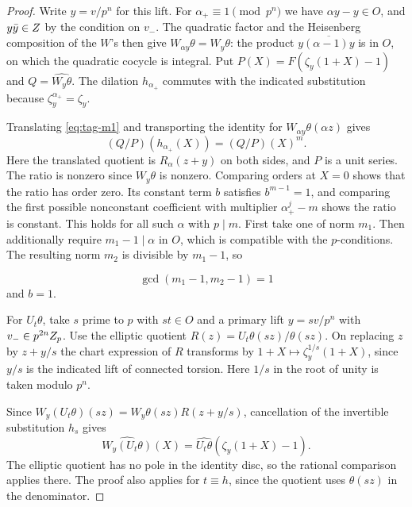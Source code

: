 \begin{proof}

Write \(y=v/p^n\) for this lift. For \(\alpha_+\equiv1\pmod{p^n}\)
we have \(\alpha y-y\in O\), and \(y\bar y\in Z\) by the
condition on \(v_-\). The quadratic factor and the
Heisenberg composition of the \(W\)'s then give
\(W_{\alpha y}\theta=W_y\theta\): the product
\(y\overline{(\alpha-1)y}\) is in \(O\), on which the
quadratic cocycle is integral. Put
\(P(X)=F(\zeta_y(1+X)-1)\) and \(Q=\widehat{W_y\theta}\).
The dilation \(h_{\alpha_+}\) commutes with the indicated
substitution because \(\zeta_y^{\alpha_+}=\zeta_y\).

Translating \eqref{eq:tag-m1} and transporting the identity for
\(W_{\alpha y}\theta(\alpha z)\) gives
\[
 (Q/P)(h_{\alpha_+}(X))=(Q/P)(X)^m .
\]
Here the translated quotient is \(R_\alpha(z+y)\) on
both sides, and \(P\) is a unit series. The ratio is nonzero
since \(W_y\theta\) is nonzero. Comparing orders at \(X=0\)
shows that the ratio has order zero. Its constant term
\(b\) satisfies \(b^{m-1}=1\), and comparing the first possible
nonconstant coefficient with multiplier \(\alpha_+^j-m\)
shows the ratio is constant. This holds for all such
\(\alpha\) with \(p\mid m\). First take one of norm \(m_1\).
Then additionally require \(m_1-1\mid\alpha\) in \(O\),
which is compatible with the \(p\)-conditions. The resulting
norm \(m_2\) is divisible by \(m_1-1\), so

\[
  \gcd(m_1-1,m_2-1)=1
\]
 and \(b=1\).


For \(U_t\theta\), take \(s\) prime to \(p\) with \(st\in O\)
and a primary lift \(y=s v/p^n\) with
\(v_-\in p^{2n}Z_p\). Use the elliptic quotient
\(R(z)=U_t\theta(sz)/\theta(sz)\).
On replacing \(z\) by \(z+y/s\) the chart expression
of \(R\) transforms by
\(1+X\mapsto\zeta_y^{1/s}(1+X)\), since \(y/s\)
is the indicated lift of connected torsion.
Here \(1/s\) in the root of unity is taken modulo \(p^n\).

Since \(W_y(U_t\theta)(sz)=W_y\theta(sz)R(z+y/s)\),
cancellation of the invertible substitution \(h_s\) gives
\[
    \widehat{W_y(U_t\theta)}(X)
              =\widehat{U_t\theta}(\zeta_y(1+X)-1).
\tag{M2}\label{eq:tag-m2}
\]
The elliptic quotient has no pole in the identity disc,
so the rational comparison applies there. The proof also
applies for \(t\equiv h\), since the quotient uses
\(\theta(sz)\) in the denominator.


\end{proof}
